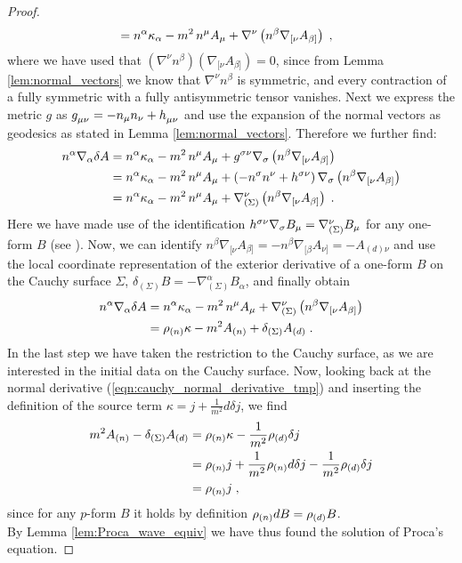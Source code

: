 \begin{proof}
\begin{align}
&= n^\alpha \kappa_\alpha - {m^2} \, n^\mu A_\mu +  \nabla^\nu \left( n^\beta  \nabla_{[\nu} A_{\beta]} \right) \; ,
\end{align}
where we have used that $\left( \nabla^\nu n^\beta \right) \left(  \nabla_{[\nu} A_{\beta]} \right) = 0 $, since from Lemma  \ref{lem:normal_vectors} we know that $\nabla^\nu n^\beta $ is symmetric, and every contraction of a fully symmetric with a fully antisymmetric tensor vanishes. Next we express the metric $g$ as $g\indices{_{\mu\nu}} = -n_\mu n_\nu + h\indices{_{\mu\nu}}$ and use the expansion of the normal vectors as geodesics as stated in Lemma \ref{lem:normal_vectors}. Therefore we further find:
\begin{align}
n^\alpha \nabla_\alpha  \delta A
&= n^\alpha \kappa_\alpha - {m^2} \, n^\mu A_\mu +  g\indices{^{\sigma\nu}} \nabla_\sigma \left( n^\beta  \nabla_{[\nu} A_{\beta]} \right) \notag\\
&= n^\alpha \kappa_\alpha - {m^2} \, n^\mu A_\mu +  \left(- n^\sigma n^\nu +  h\indices{^{\sigma\nu}} \right) \nabla_\sigma \left( n^\beta  \nabla_{[\nu} A_{\beta]} \right) \notag \\
&= n^\alpha \kappa_\alpha - {m^2} \, n^\mu A_\mu  + \nabla_{(\Sigma)}^{\nu} \left( n^\beta  \nabla_{[\nu} A_{\beta]} \right) \formspace.
\end{align}
Here we have made use of the identification $ h\indices{^{\sigma\nu}} \nabla_\sigma B_\mu= \nabla_{(\Sigma)}^\nu  B_\mu$ for any one-form $B$ (see \cite[Lemma 10.2.1]{wald_GR}).
Now, we can identify $n^\beta  \nabla_{[\nu} A_{\beta]} = - n^\beta  \nabla_{[\beta} A_{\nu]} =- A_{(d)\nu}$ and use the local coordinate representation of the exterior derivative of a one-form $B$ on the Cauchy surface $\Sigma$, $\delta_{(\Sigma)} B =  -\nabla_{(\Sigma)} ^\alpha B_\alpha$, and finally obtain
\begin{align}
n^\alpha \nabla_\alpha  \delta A
&=n^\alpha \kappa_\alpha - m^2 \, n^\mu A_\mu  + \nabla_{(\Sigma)}^\nu \left( n^\beta  \nabla_{[\nu} A_{\beta]} \right) \notag \\
&=\rho_{(n)} \kappa - m^2 {A_{(n)}}  + \delta_{(\Sigma)} {A_{(d)}} \;.
\end{align}
In the last step we have taken the restriction to the Cauchy surface, as we are interested in the initial data on the Cauchy surface.
Now, looking back at the normal derivative (\ref{eqn:cauchy_normal_derivative_tmp}) and inserting the definition of the source term $\kappa = j + \frac{1}{m^2}d \delta j$, we find
\begin{align}
 m^2 {A_{(n)}}  - \delta_{(\Sigma)} {A_{(d)}}
 &= \rho_{(n)} \kappa - \frac{1}{m^2} \rho_{(d)} \delta j \notag\\
&= \rho_{(n)} j + \frac{1}{m^2} \rho_{(n)} d \delta j - \frac{1}{m^2} \rho_{(d)} \delta j \notag\\
&=  \rho_{(n)} j \;,
\end{align}
since for any $p$-form $B$ it holds by definition $\rho_{(n)} dB = \rho_{(d)} B$.\\
By Lemma \ref{lem:Proca_wave_equiv} we have thus found the solution of Proca's equation.
\end{proof}
